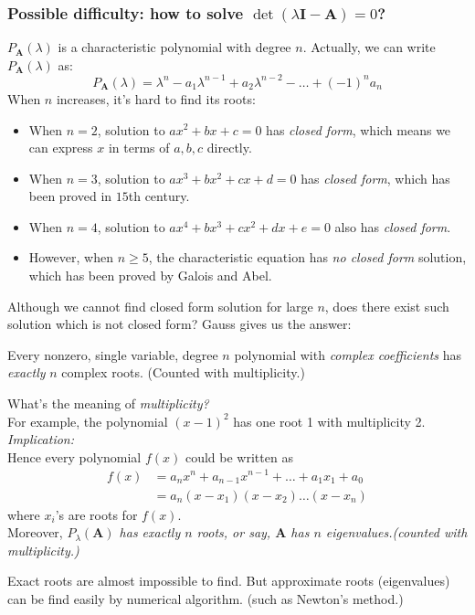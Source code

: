 \subsubsection{Possible difficulty: how to solve $\det(\lambda\bm I-\bm A)=0$?}
$P_{\bm A}(\lambda)$ is a characteristic polynomial with degree $n$. Actually, we can write $P_{\bm A}(\lambda)$ as:
\[
P_{\bm A}(\lambda)=\lambda^n-a_1\lambda^{n-1}+a_2\lambda^{n-2}-\dots+(-1)^{n}a_n
\]
When $n$ increases, it's hard to find its roots:
\begin{itemize}
\item
When $n=2$, solution to $ax^2+bx+c=0$ has \textit{closed form}, which means we can express $x$ in terms of $a,b,c$ directly.
\item
When $n=3$, solution to $ax^3+bx^2+cx+d=0$ has \textit{closed form}, which has been proved in $15$th century.
\item
When $n=4$, solution to $ax^4+bx^3+cx^2+dx+e=0$ also has \textit{closed form}.
\item
However, when $n\ge5$, the characteristic equation has \textit{no closed form} solution, which has been proved by Galois and Abel.
\end{itemize}
Although we cannot find closed form solution for large $n$, does there exist such solution which is not closed form? Gauss gives us the answer:
\begin{theorem}
Every nonzero, single variable, degree $n$ polynomial with \textit{complex coefficients} has \textit{exactly} $n$ complex roots. (Counted with multiplicity.)
\end{theorem}
What's the meaning of \textit{multiplicity?}\\ For example, the polynomial $(x-1)^2$ has one root 1 with multiplicity 2.\\
\newpage
\emph{Implication: }\\
Hence every polynomial $f(x)$ could be written as
\begin{align*}
f(x)&=a_nx^n+a_{n-1}x^{n-1}+\dots+a_1x_1+a_0\\
&=a_n(x-x_1)(x-x_2)\dots(x-x_n)
\end{align*}
where $x_i$'s are roots for $f(x)$.\\
Moreover, \emph{$P_{\lambda}(\bm A)$ has exactly $n$ roots, or say, $\bm A$ has $n$ eigenvalues.(counted with multiplicity.)}
\begin{remark}
Exact roots are almost impossible to find. But approximate roots (eigenvalues) can be find easily by numerical algorithm. (such as Newton's method.)
\end{remark}
